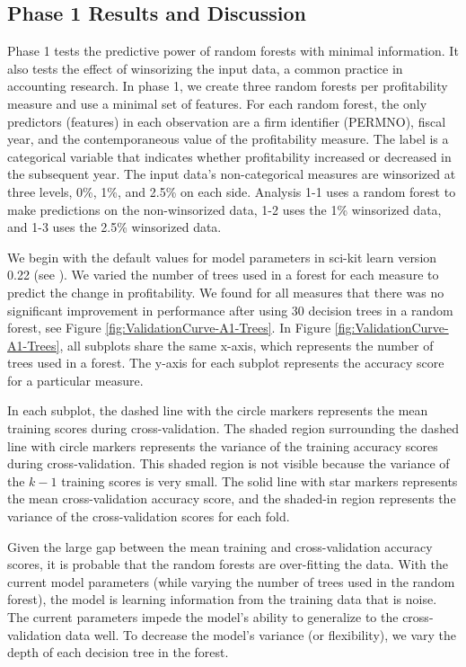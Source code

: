 \subsection{Phase 1 Results and Discussion}
Phase 1 tests the predictive power of random forests with minimal information. It also tests the effect of winsorizing the input data, a common practice in accounting research.  In phase 1, we create three random forests per profitability measure and use a minimal set of features. For each random forest, the only predictors (features) in each observation are a firm identifier (PERMNO),  fiscal year, and the contemporaneous value of the profitability measure. The label is a categorical variable that indicates whether profitability increased or decreased in the subsequent year. The input data's non-categorical measures are winsorized at three levels, 0\%, 1\%, and 2.5\% on each side. Analysis 1-1 uses a random forest to make predictions on the non-winsorized data, 1-2 uses the 1\% winsorized data, and 1-3 uses the 2.5\% winsorized data.

We begin with the default values for model parameters in sci-kit learn version 0.22 (see \cite{scikit-learn}). We varied the number of trees used in a forest for each measure to predict the change in profitability. We found for all measures that there was no significant improvement in performance after using 30 decision trees in a random forest, see Figure \ref{fig:ValidationCurve-A1-Trees}. In Figure \ref{fig:ValidationCurve-A1-Trees}, all subplots share the same x-axis, which represents the number of trees used in a forest. The y-axis for each subplot represents the accuracy score for a particular measure.

In each subplot, the dashed line with the circle markers represents the mean training scores during cross-validation. The shaded region surrounding the dashed line with circle markers represents the variance of the training accuracy scores during cross-validation.  This shaded region is not visible because the variance of the \(k-1\) training scores is very small. The solid line with star markers represents the mean cross-validation accuracy score, and the shaded-in region represents the variance of the cross-validation scores for each fold.

Given the large gap between the mean training and cross-validation accuracy scores, it is probable that the random forests are over-fitting the data. With the current model parameters (while varying the number of trees used in the random forest), the model is learning information from the training data that is noise. The current parameters impede the model's ability to generalize to the cross-validation data well. To decrease the model's variance (or flexibility), we vary the depth of each decision tree in the forest. 

